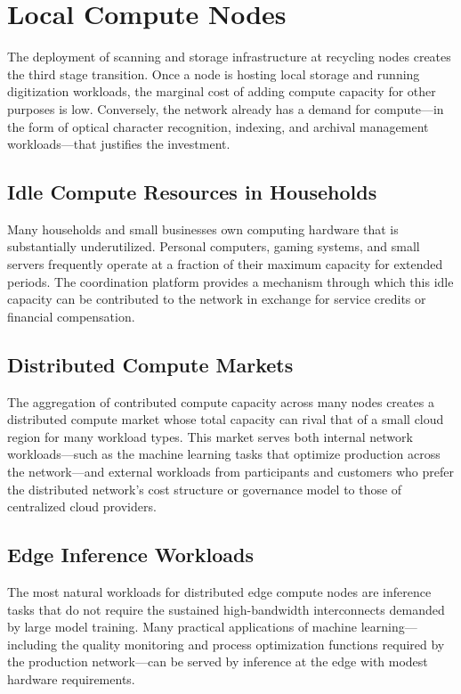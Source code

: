 \documentclass[12pt]{book}
\theoremstyle{definition}
\theoremstyle{remark}
\begin{document}
\chapter{Local Compute Nodes}

The deployment of scanning and storage infrastructure at recycling
nodes creates the third stage transition. Once a node is hosting
local storage and running digitization workloads, the marginal cost
of adding compute capacity for other purposes is low. Conversely,
the network already has a demand for compute---in the form of
optical character recognition, indexing, and archival management
workloads---that justifies the investment.

\section{Idle Compute Resources in Households}

Many households and small businesses own computing hardware that is
substantially underutilized. Personal computers, gaming systems,
and small servers frequently operate at a fraction of their
maximum capacity for extended periods. The coordination platform
provides a mechanism through which this idle capacity can be
contributed to the network in exchange for service credits or
financial compensation.

\section{Distributed Compute Markets}

The aggregation of contributed compute capacity across many nodes
creates a distributed compute market whose total capacity can
rival that of a small cloud region for many workload types. This
market serves both internal network workloads---such as the
machine learning tasks that optimize production across the
network---and external workloads from participants and customers
who prefer the distributed network's cost structure or governance
model to those of centralized cloud providers.

\section{Edge Inference Workloads}

The most natural workloads for distributed edge compute nodes are
inference tasks that do not require the sustained high-bandwidth
interconnects demanded by large model training. Many practical
applications of machine learning---including the quality monitoring
and process optimization functions required by the production
network---can be served by inference at the edge with modest
hardware requirements.
\end{document}
